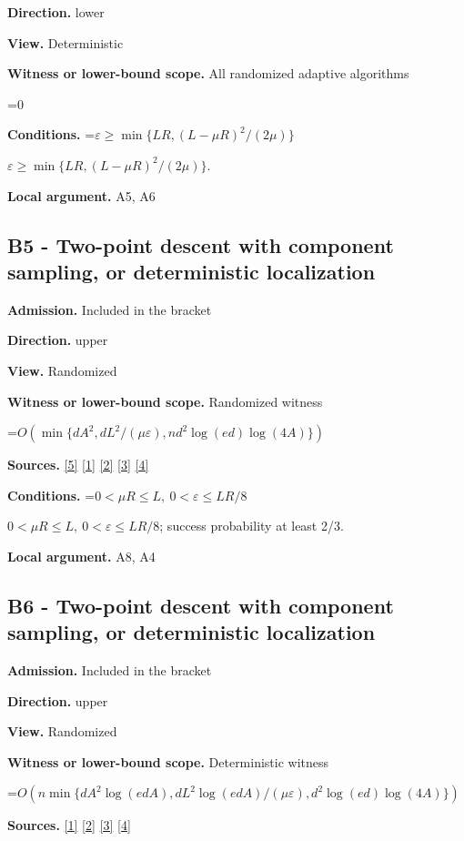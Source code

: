 \documentclass[10pt,a4paper]{article}
\newcommand{\AtlasMath}[1]{\par\begingroup\centering\setbox0=\hbox{$\displaystyle #1$}\ifdim\wd0>1.4\linewidth\typeout{ATLAS WIDE FORMULA: \the\wd0}\fi\ifdim\wd0>\linewidth\resizebox{\linewidth}{!}{\box0}\else\box0\fi\par\endgroup}
\newcommand{\AtlasInlineMath}[1]{\begingroup\setbox0=\hbox{$#1$}\ifdim\wd0>.4\linewidth\endgroup\AtlasMath{#1}\else\endgroup$#1$\fi}
\begin{document}
\textbf{Direction.} lower

\textbf{View.} Deterministic

\textbf{Witness or lower-bound scope.} All randomized adaptive algorithms

\AtlasMath{0}
\textbf{Conditions.} \AtlasInlineMath{\varepsilon\ge\min\{LR,(L-\mu R)^2/(2\mu)\}}.

\textbf{Local argument.} A5, A6

\subsection{B5 - Two-point descent with component sampling, or deterministic localization}
\textbf{Admission.} Included in the bracket

\textbf{Direction.} upper

\textbf{View.} Randomized

\textbf{Witness or lower-bound scope.} Randomized witness

\AtlasMath{O(\min\{dA^2,dL^2/(\mu\varepsilon),nd^2\log(ed)\log(4A)\})}
\textbf{Sources.} \href{https://jmlr.org/papers/volume18/16-632/16-632.pdf}{[5]} \href{https://arxiv.org/html/2607.16558v2}{[1]} \href{https://www.mathnet.ru/php/archive.phtml?jrnid=mzm&option_lang=eng&paperid=1697&wshow=paper}{[2]} \href{https://arxiv.org/html/2610.00345v1}{[3]} \href{https://arxiv.org/abs/2109.08858}{[4]}

\textbf{Conditions.} \AtlasInlineMath{0<\mu R\le L,\ 0<\varepsilon\le LR/8}; success probability at least 2/3.

\textbf{Local argument.} A8, A4

\subsection{B6 - Two-point descent with component sampling, or deterministic localization}
\textbf{Admission.} Included in the bracket

\textbf{Direction.} upper

\textbf{View.} Randomized

\textbf{Witness or lower-bound scope.} Deterministic witness

\AtlasMath{O\!\left(n\min\{dA^2\log(edA),dL^2\log(edA)/(\mu\varepsilon),d^2\log(ed)\log(4A)\}\right)}
\textbf{Sources.} \href{https://arxiv.org/html/2607.16558v2}{[1]} \href{https://www.mathnet.ru/php/archive.phtml?jrnid=mzm&option_lang=eng&paperid=1697&wshow=paper}{[2]} \href{https://arxiv.org/html/2610.00345v1}{[3]} \href{https://arxiv.org/abs/2109.08858}{[4]}
\end{document}
